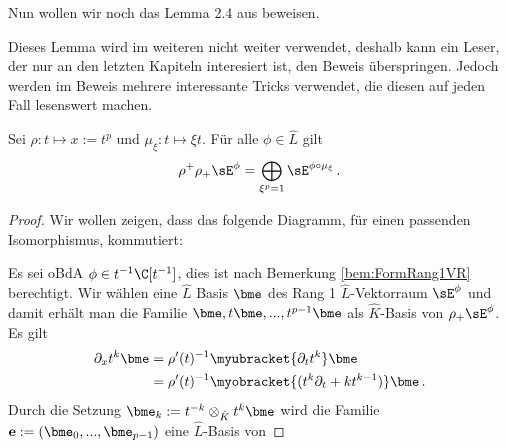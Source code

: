 Nun wollen wir noch das Lemma 2.4 aus \cite[Lem 2.4]{sabbah_Fourier-local}
beweisen. 
\begin{comment}
TODO: text löschen?
\end{comment}
Dieses Lemma wird im weiteren nicht weiter verwendet, deshalb kann ein Leser,
der nur an den letzten Kapiteln interesiert ist, den Beweis überspringen.
Jedoch werden im Beweis mehrere interessante Tricks verwendet, die diesen auf
jeden Fall lesenswert machen.
\begin{lem}
Sei $\rho:t\mapsto x:=t^p$ und $\mu_\xi:t\mapsto\xi t$.
Für alle $\phi \in \hat L$ gilt
\[
\rho^+\rho_+\sE^\phi=\bigoplus_{\xi^p=1}\sE^{\phi\circ\mu_\xi} \,.
\]
\end{lem}
%
\begin{proof}
Wir wollen zeigen, dass das folgende Diagramm, für einen passenden
Isomorphismus, kommutiert:
\begin{center}
\end{center}
Es sei oBdA $\phi\in t^{-1}\C[t^{-1}]$, dies ist nach Bemerkung 
\ref{bem:FormRang1VR} berechtigt.
Wir wählen eine $\hat L$ Basis $\bme$ des Rang 1 $\hat L$-Vektorraum $\sE^\phi$
und damit erhält man die Familie $\bme,t\bme,...,t^{p-1}\bme$ als $\hat
K$-Basis von $\rho_+\sE^\phi$.
Es gilt 
\begin{equation} \label{eq:2-4-basisAbleitung}
\begin{aligned}
\partial_xt^{k}\bme &= \rho'(t)^{-1}\myubracket{\partial_tt^{k}}\bme
\\&= \rho'(t)^{-1}\myobracket{(t^{k}\partial_t + kt^{k-1})}\bme \,.
\end{aligned}
\end{equation}
Durch die Setzung $\bme_k:=t^{-k}\otimes_{\hat K}t^k\bme$ wird die Familie
$\mathbf{e}:=(\bme_0,...,\bme_{p-1})$ eine $\hat L$-Basis von

\end{proof}
